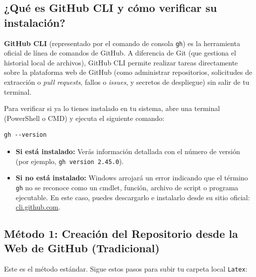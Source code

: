 \documentclass[
10pt, %
a4paper, %
oneside, %
headinclude,footinclude, %
BCOR5mm, %
]{scrartcl}
\begin{document}
\subsection{¿Qué es GitHub CLI y cómo verificar su instalación?}
\textbf{GitHub CLI} (representado por el comando de consola \texttt{gh}) es la herramienta oficial de línea de comandos de GitHub. A diferencia de Git (que gestiona el historial local de archivos), GitHub CLI permite realizar tareas directamente sobre la plataforma web de GitHub (como administrar repositorios, solicitudes de extracción o \textit{pull requests}, fallos o \textit{issues}, y secretos de despliegue) sin salir de tu terminal.

Para verificar si ya lo tienes instalado en tu sistema, abre una terminal (PowerShell o CMD) y ejecuta el siguiente comando:
\begin{lstlisting}[language=DOS]
gh --version
\end{lstlisting}

\begin{itemize}
	\item \textbf{Si está instalado:} Verás información detallada con el número de versión (por ejemplo, \texttt{gh version 2.45.0}).
	\item \textbf{Si no está instalado:} Windows arrojará un error indicando que el término \texttt{gh} no se reconoce como un cmdlet, función, archivo de script o programa ejecutable. En este caso, puedes descargarlo e instalarlo desde su sitio oficial: \href{https://cli.github.com/}{cli.github.com}.
\end{itemize}

\subsection{Método 1: Creación del Repositorio desde la Web de GitHub (Tradicional)}
Este es el método estándar. Sigue estos pasos para subir tu carpeta local \texttt{Latex}:
\end{document}
